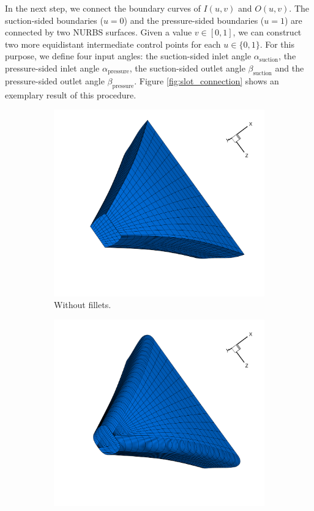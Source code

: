 \documentclass[a4paper, 11pt]{report}
\theoremstyle{definition}
\begin{document}
	In the next step, we connect the boundary curves of $I(u,v)$ and $O(u,v)$. The suction-sided boundaries ($u = 0$) and the pressure-sided boundaries ($u = 1$) are connected by two NURBS surfaces. Given a value $v \in [0,1]$, we can construct two more equidistant intermediate control points for each $u \in \{0,1\}$. For this purpose, we define four input angles: the suction-sided inlet angle $\alpha_\textrm{suction}$, the pressure-sided inlet angle $\alpha_\textrm{pressure}$, the suction-sided outlet angle $\beta_\textrm{suction}$ and the pressure-sided outlet angle $\beta_\textrm{pressure}$. Figure \ref{fig:slot_connection} shows an exemplary result of this procedure.

	\begin{figure}[H]
		\centering
		\begin{subfigure}{.39\textwidth}
			\includegraphics[width=\textwidth]{../tec/slots/17.png}
			\caption{Without fillets.}
		\end{subfigure}
		\begin{subfigure}{.39\textwidth}
			\includegraphics[width=\textwidth]{../tec/slots/18.png}

\end{subfigure}
\end{figure}
\end{document}
